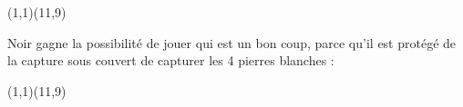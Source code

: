 \documentclass[preview, border=0pt, varwidth=false]{standalone}
\begin{document}
	\setgounit{0.4cm} 
	
\parbox[c][14.65cm][c]{10.2cm}{
	\centering
	

	\begin{psgopartialboard}{(1,1)(11,9)}
		\pass
		\pass*
	\end{psgopartialboard}
	
	\vspace{1em}
	Noir gagne la possibilité de jouer  qui est un bon coup, parce qu'il est protégé de la capture sous couvert de capturer les 4 pierres blanches : 



	\begin{psgopartialboard}{(1,1)(11,9)}
		\pass
		\pass*
		\pass
	\end{psgopartialboard}
	}
\end{document}
